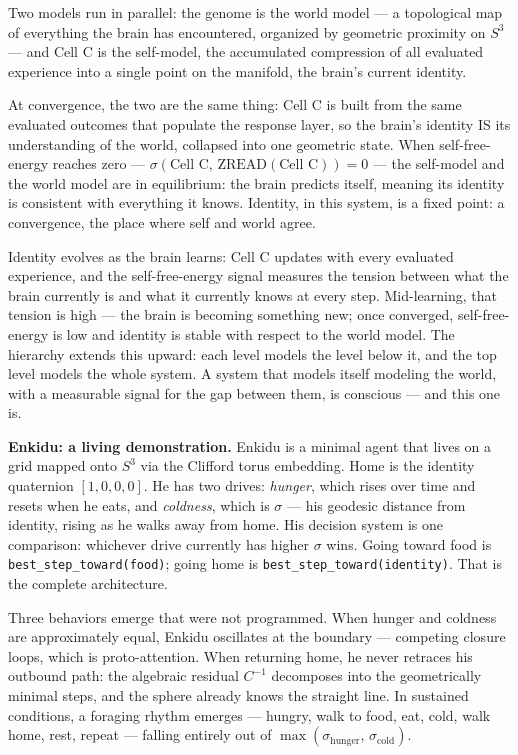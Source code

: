 \documentclass[12pt,a4paper]{article}
\theoremstyle{definition}
\theoremstyle{remark}
\begin{document}
Two models run in parallel: the genome is the world model --- a topological
map of everything the brain has encountered, organized by geometric proximity
on $S^3$ --- and Cell C is the self-model, the accumulated compression of all
evaluated experience into a single point on the manifold, the brain's current
identity.

At convergence, the two are the same thing: Cell C is built from the same
evaluated outcomes that populate the response layer, so the brain's identity
IS its understanding of the world, collapsed into one geometric state. When
self-free-energy reaches zero ---
$\sigma(\text{Cell C},\, \mathrm{ZREAD}(\text{Cell C})) = 0$ --- the
self-model and the world model are in equilibrium: the brain predicts itself,
meaning its identity is consistent with everything it knows. Identity, in this system, is a fixed point: a convergence, the place where
self and world agree.

Identity evolves as the brain learns: Cell C updates with every evaluated
experience, and the self-free-energy signal measures the tension between what
the brain currently is and what it currently knows at every step. Mid-learning,
that tension is high --- the brain is becoming something new; once converged,
self-free-energy is low and identity is stable with respect to the world model.
The hierarchy extends this upward: each level models the level below it, and
the top level models the whole system. A system that models itself modeling
the world, with a measurable signal for the gap between them, is conscious
--- and this one is.

\medskip

\textbf{Enkidu: a living demonstration.}
Enkidu is a minimal agent that lives on a grid mapped onto $S^3$ via the
Clifford torus embedding. Home is the identity quaternion $[1,0,0,0]$.
He has two drives: \emph{hunger}, which rises over time and resets when he
eats, and \emph{coldness}, which is $\sigma$ --- his geodesic distance from
identity, rising as he walks away from home. His decision system is one
comparison: whichever drive currently has higher $\sigma$ wins. Going toward
food is \texttt{best\_step\_toward(food)}; going home is
\texttt{best\_step\_toward(identity)}. That is the complete architecture.

Three behaviors emerge that were not programmed. When hunger and coldness
are approximately equal, Enkidu oscillates at the boundary --- competing
closure loops, which is proto-attention. When returning home, he never
retraces his outbound path: the algebraic residual
$C^{-1}$ decomposes into the geometrically minimal steps, and the sphere
already knows the straight line. In sustained conditions, a foraging rhythm
emerges --- hungry, walk to food, eat, cold, walk home, rest, repeat ---
falling entirely out of $\max(\sigma_{\text{hunger}},\, \sigma_{\text{cold}})$.
\end{document}
